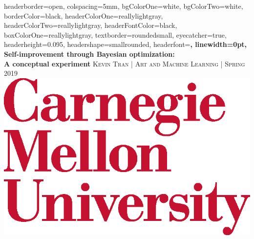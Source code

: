 \documentclass[paperwidth=30in,paperheight=40in,fontscale=0.35]{baposter} %
\begin{document}
\begin{poster}
{%
headerborder=open, %
colspacing=5mm, %
bgColorOne=white, %
bgColorTwo=white, %
borderColor=black, %
headerColorOne=reallylightgray, %
headerColorTwo=reallylightgray, %
headerFontColor=black, %
boxColorOne=reallylightgray, %
textborder=roundedsmall, %
eyecatcher=true, %
headerheight=0.095\textheight, %
headershape=smallrounded, %
headerfont=\Large\bf\textsc, %
linewidth=0pt, %
}
{} %
{\textbf{Self-improvement through Bayesian optimization:\\A conceptual experiment}\vspace{2mm}} %
{%
    \textsc{Kevin Tran | Art and Machine Learning | Spring 2019} \\
}
{\includegraphics[height=0.07\textheight]{CMU_Logo_Stack_Red.eps}} %



\end{poster}
\end{document}
